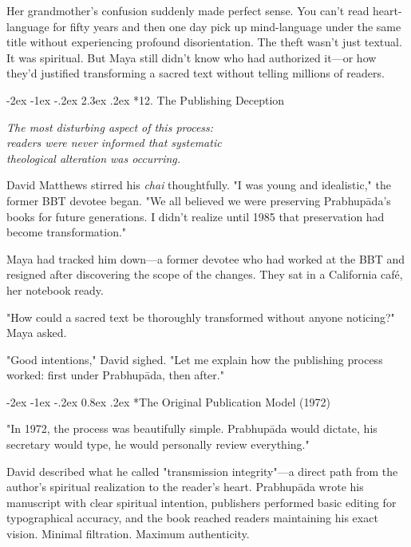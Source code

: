 \documentclass[12pt,twoside]{book}
\makeatletter
\renewcommand\section{\@startsection{section}{1}{\z@}%
{-3.5ex \@plus -1ex \@minus -.2ex}%
{2.3ex \@plus.2ex}%
{\normalfont\Large\bfseries}}
\let\oldsection\section
\renewcommand{\section}[1]{\needspace{4\baselineskip}\oldsection{#1}}
\let\oldsubsection\subsection
\renewcommand{\subsection}[1]{\needspace{3\baselineskip}\oldsubsection{#1}}
\def\cleardoublepage{\clearpage\if@twoside \ifodd\c@page\else\hbox{}\thispagestyle{empty}\newpage\if@twocolumn\hbox{}\newpage\fi\fi\fi}
\renewcommand\section{\@startsection{section}{1}{\z@}%
{-2ex \@plus -1ex \@minus -.2ex}%
{2.3ex \@plus.2ex}%
{\normalfont\Large\bfseries}}
\renewcommand\subsection{\@startsection{subsection}{2}{\z@}%
{-2ex \@plus -1ex \@minus -.2ex}%
{0.8ex \@plus .2ex}%
{\normalfont\large\bfseries}}
\makeatother
\begin{document}
Her grandmother's confusion suddenly made perfect sense. You can't read heart-language for fifty years and then one day pick up mind-language under the same title without experiencing profound disorientation. The theft wasn't just textual. It was spiritual. But Maya still didn't know who had authorized it—or how they'd justified transforming a sacred text without telling millions of readers.

\cleardoublepage
\vspace*{0.20\textheight}
\section*{12. The Publishing Deception}
\thispagestyle{chapterpage}

{\centering\itshape The most disturbing aspect of this process:\\readers were never informed that systematic\\theological alteration was occurring.\par}
\vspace{0.1cm}

\normalfont\justifying
David Matthews stirred his \emph{chai} thoughtfully. "I was young and idealistic," the former BBT devotee began. "We all believed we were preserving Prabhupāda's books for future generations. I didn't realize until 1985 that preservation had become transformation."

Maya had tracked him down—a former devotee who had worked at the BBT and resigned after discovering the scope of the changes. They sat in a California café, her notebook ready.

"How could a sacred text be thoroughly transformed without anyone noticing?" Maya asked.

"Good intentions," David sighed. "Let me explain how the publishing process worked: first under Prabhupāda, then after."

\vspace{0.1cm}
\subsection*{The Original Publication Model (1972)}

"In 1972, the process was beautifully simple. Prabhupāda would dictate, his secretary would type, he would personally review everything."

David described what he called "transmission integrity"—a direct path from the author's spiritual realization to the reader's heart. Prabhupāda wrote his manuscript with clear spiritual intention, publishers performed basic editing for typographical accuracy, and the book reached readers maintaining his exact vision. Minimal filtration. Maximum authenticity.
\end{document}
